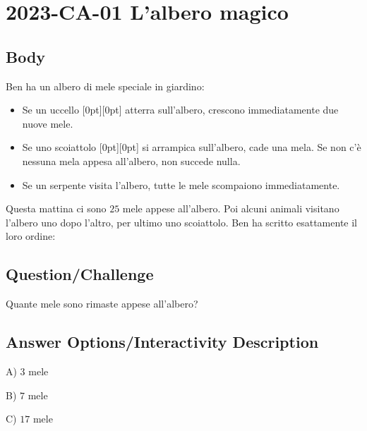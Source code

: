 \documentclass[a4paper,11pt]{report}
\newcommand{\taskGraphicsFolder}{..}
\begin{document}
\section*{\centering{} 2023-CA-01 L’albero magico}


\subsection*{Body}

Ben ha un albero di mele speciale in giardino:

\begin{itemize}
  \item Se un uccello \raisebox{-0.5ex}[0pt][0pt]{} atterra sull’albero, crescono immediatamente due nuove mele.
  \item Se uno scoiattolo \raisebox{-0.5ex}[0pt][0pt]{} si arrampica sull’albero, cade una mela. Se non c’è nessuna mela appesa all’albero, non succede nulla.
  \item Se un serpente \raisebox{-0.5ex}{} visita l’albero, tutte le mele scompaiono immediatamente.
\end{itemize}

Questa mattina ci sono $25$ mele appese all’albero. Poi alcuni animali visitano l’albero uno dopo l’altro, per ultimo uno scoiattolo. Ben ha scritto esattamente il loro ordine:

{\centering%
\par}

{\em

\subsection*{Question/Challenge}

Quante mele sono rimaste appese all’albero?

}\begingroup
\renewcommand{\arraystretch}{1.5}
\subsection*{Answer Options/Interactivity Description}

A) $3$ mele

B) $7$ mele

C) $17$ mele
\end{document}
